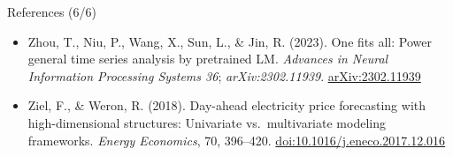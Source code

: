 \begin{frame}{References (6/6)}
\begin{itemize}
    \item Zhou, T., Niu, P., Wang, X., Sun, L., \& Jin, R. (2023). One fits all: Power general time series analysis by pretrained LM. \textit{Advances in Neural Information Processing Systems 36}; \textit{arXiv:2302.11939}. \href{https://arxiv.org/abs/2302.11939}{arXiv:2302.11939}
    \item Ziel, F., \& Weron, R. (2018). Day-ahead electricity price forecasting with high-dimensional structures: Univariate vs.\ multivariate modeling frameworks. \textit{Energy Economics}, 70, 396--420. \href{https://doi.org/10.1016/j.eneco.2017.12.016}{doi:10.1016/j.eneco.2017.12.016}
\end{itemize}
\end{frame}


